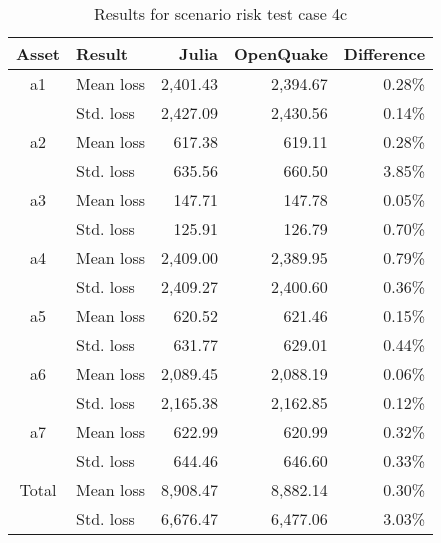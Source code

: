 \begin{table}[htbp]

\centering
\begin{tabular}{ c l r r r }

\hline
\rowcolor{anti-flashwhite}
\bf{Asset} & \bf{Result} & \bf{Julia} & \bf{OpenQuake} & \bf{Difference}\\
\hline
a1 & Mean loss & 2,401.43 & 2,394.67 & 0.28\% \\
 & Std. loss & 2,427.09 & 2,430.56 & 0.14\% \\
\hline
a2 & Mean loss & 617.38 & 619.11 & 0.28\% \\
 & Std. loss & 635.56 & 660.50 & 3.85\% \\
\hline
a3 & Mean loss & 147.71 & 147.78 & 0.05\% \\
 & Std. loss & 125.91 & 126.79 & 0.70\% \\
\hline
a4 & Mean loss & 2,409.00 & 2,389.95 & 0.79\% \\
 & Std. loss & 2,409.27 & 2,400.60 & 0.36\% \\
\hline
a5 & Mean loss & 620.52 & 621.46 & 0.15\% \\
 & Std. loss & 631.77 & 629.01 & 0.44\% \\
\hline
a6 & Mean loss & 2,089.45 & 2,088.19 & 0.06\% \\
 & Std. loss & 2,165.38 & 2,162.85 & 0.12\% \\
\hline
a7 & Mean loss & 622.99 & 620.99 & 0.32\% \\
 & Std. loss & 644.46 & 646.60 & 0.33\% \\
\hline
Total & Mean loss & 8,908.47 & 8,882.14 & 0.30\% \\
 & Std. loss & 6,676.47 & 6,477.06 & 3.03\% \\
\hline
\end{tabular}

\caption{Results for scenario risk test case 4c}
\label{tab:result-sr-4c}
\end{table}
